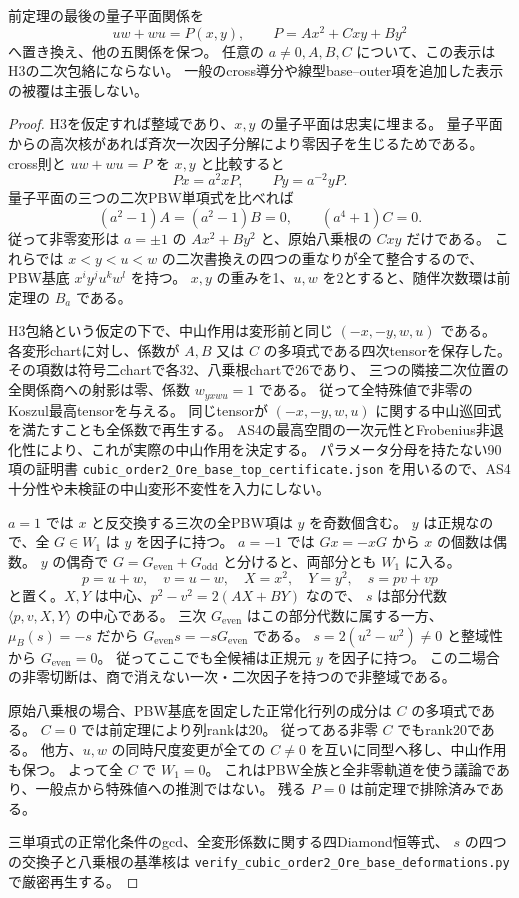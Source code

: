 \begin{theorem}[単項Ore族の全base二次変形も排除される]
\label{thm:h3-order2-Ore-base-deformations}
前定理の最後の量子平面関係を
\[
 uw+wu=P(x,y),\qquad P=A x^2+Cxy+B y^2
\]
へ置き換え、他の五関係を保つ。
任意の $a\ne0,A,B,C$ について、この表示はH3の二次包絡にならない。
一般のcross導分や線型base--outer項を追加した表示の被覆は主張しない。
\end{theorem}
\begin{proof}
H3を仮定すれば整域であり、$x,y$ の量子平面は忠実に埋まる。
量子平面からの高次核があれば斉次一次因子分解により零因子を生じるためである。
cross則と $uw+wu=P$ を $x,y$ と比較すると
\[
 Px=a^2xP,\qquad Py=a^{-2}yP.
\]
量子平面の三つの二次PBW単項式を比べれば
\[
 (a^2-1)A=(a^2-1)B=0,\qquad (a^4+1)C=0.
\]
従って非零変形は $a=\pm1$ の $Ax^2+By^2$ と、原始八乗根の $Cxy$ だけである。
これらでは $x<y<u<w$ の二次書換えの四つの重なりが全て整合するので、
PBW基底 $x^iy^ju^kw^l$ を持つ。
$x,y$ の重みを1、$u,w$ を2とすると、随伴次数環は前定理の $B_a$ である。

H3包絡という仮定の下で、中山作用は変形前と同じ
$(-x,-y,w,u)$ である。
各変形chartに対し、係数が $A,B$ 又は $C$ の多項式である四次tensorを保存した。
その項数は符号二chartで各32、八乗根chartで26であり、
三つの隣接二次位置の全関係商への射影は零、係数 $w_{yxwu}=1$ である。
従って全特殊値で非零のKoszul最高tensorを与える。
同じtensorが $(-x,-y,w,u)$ に関する中山巡回式を満たすことも全係数で再生する。
AS4の最高空間の一次元性とFrobenius非退化性により、これが実際の中山作用を決定する。
パラメータ分母を持たない90項の証明書
\texttt{cubic\_\allowbreak{}order2\_\allowbreak{}Ore\_\allowbreak{}base\_\allowbreak{}top\_\allowbreak{}certificate.json}
を用いるので、AS4十分性や未検証の中山変形不変性を入力にしない。

$a=1$ では $x$ と反交換する三次の全PBW項は $y$ を奇数個含む。
$y$ は正規なので、全 $G\in W_1$ は $y$ を因子に持つ。
$a=-1$ では $Gx=-xG$ から $x$ の個数は偶数。
$y$ の偶奇で $G=G_{\mathrm{even}}+G_{\mathrm{odd}}$ と分けると、両部分とも $W_1$ に入る。
\[
 p=u+w,\quad v=u-w,\quad X=x^2,\quad Y=y^2,\quad s=pv+vp
\]
と置く。$X,Y$ は中心、$p^2-v^2=2(AX+BY)$ なので、
$s$ は部分代数 $\langle p,v,X,Y\rangle$ の中心である。
三次 $G_{\mathrm{even}}$ はこの部分代数に属する一方、
$\mu_B(s)=-s$ だから
$G_{\mathrm{even}}s=-sG_{\mathrm{even}}$ である。
$s=2(u^2-w^2)\ne0$ と整域性から $G_{\mathrm{even}}=0$。
従ってここでも全候補は正規元 $y$ を因子に持つ。
この二場合の非零切断は、商で消えない一次・二次因子を持つので非整域である。

原始八乗根の場合、PBW基底を固定した正常化行列の成分は $C$ の多項式である。
$C=0$ では前定理により列rankは20。
従ってある非零 $C$ でもrank20である。
他方、$u,w$ の同時尺度変更が全ての $C\ne0$ を互いに同型へ移し、中山作用も保つ。
よって全 $C$ で $W_1=0$。
これはPBW全族と全非零軌道を使う議論であり、一般点から特殊値への推測ではない。
残る $P=0$ は前定理で排除済みである。

三単項式の正常化条件のgcd、全変形係数に関する四Diamond恒等式、
$s$ の四つの交換子と八乗根の基準核は
\texttt{verify\_\allowbreak{}cubic\_\allowbreak{}order2\_\allowbreak{}Ore\_\allowbreak{}base\_\allowbreak{}deformations.py}
で厳密再生する。
\end{proof}

